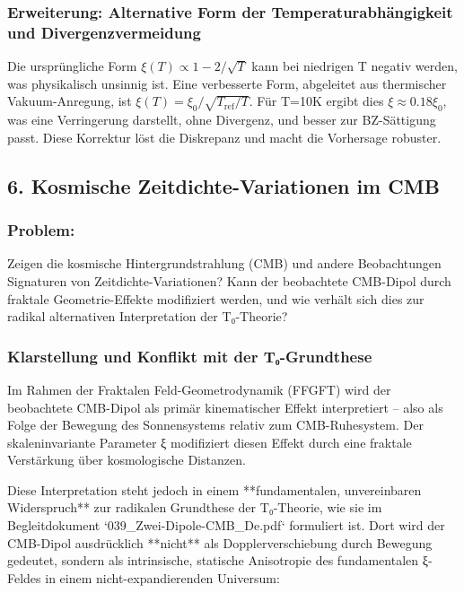 \documentclass[12pt,a4paper]{article}
\begin{document}
	\subsubsection*{Erweiterung: Alternative Form der Temperaturabhängigkeit und Divergenzvermeidung}
	Die ursprüngliche Form $\xi(T) \propto 1 - 2/\sqrt{T}$ kann bei niedrigen T negativ werden, was physikalisch unsinnig ist. Eine verbesserte Form, abgeleitet aus thermischer Vakuum-Anregung, ist $\xi(T) = \xi_0 / \sqrt{T_{\text{ref}}/T}$. Für T=10K ergibt dies $\xi \approx 0.18 \xi_0$, was eine Verringerung darstellt, ohne Divergenz, und besser zur BZ-Sättigung passt. Diese Korrektur löst die Diskrepanz und macht die Vorhersage robuster.
	
	\subsection*{6. Kosmische Zeitdichte-Variationen im CMB}
	
	\subsubsection*{Problem:}
	Zeigen die kosmische Hintergrundstrahlung (CMB) und andere Beobachtungen Signaturen von Zeitdichte-Variationen? Kann der beobachtete CMB-Dipol durch fraktale Geometrie-Effekte modifiziert werden, und wie verhält sich dies zur radikal alternativen Interpretation der T₀-Theorie?
	
	\subsubsection*{Klarstellung und Konflikt mit der T₀-Grundthese}
	
	Im Rahmen der Fraktalen Feld-Geometrodynamik (FFGFT) wird der beobachtete CMB-Dipol als primär kinematischer Effekt interpretiert – also als Folge der Bewegung des Sonnensystems relativ zum CMB-Ruhesystem. Der skaleninvariante Parameter ξ modifiziert diesen Effekt durch eine fraktale Verstärkung über kosmologische Distanzen.
	
	Diese Interpretation steht jedoch in einem **fundamentalen, unvereinbaren Widerspruch** zur radikalen Grundthese der T₀-Theorie, wie sie im Begleitdokument `039\_Zwei-Dipole-CMB\_De.pdf` formuliert ist. Dort wird der CMB-Dipol ausdrücklich **nicht** als Dopplerverschiebung durch Bewegung gedeutet, sondern als intrinsische, statische Anisotropie des fundamentalen ξ-Feldes in einem nicht-expandierenden Universum:
	
\end{document}
